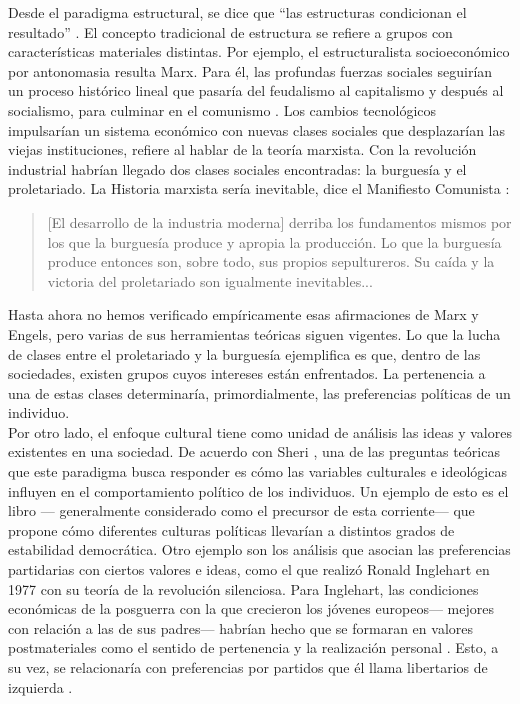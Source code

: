 Desde el paradigma estructural, se dice que ``las estructuras condicionan el resultado'' \parencite{BV08}. El concepto tradicional de estructura se refiere a grupos con características materiales distintas. Por ejemplo, el estructuralista socioeconómico por antonomasia resulta Marx. Para él, las profundas fuerzas sociales seguirían un proceso histórico lineal que pasaría del feudalismo al capitalismo y después al socialismo, para culminar en el comunismo \parencite{BV08}. Los cambios tecnológicos impulsarían un sistema económico con nuevas clases sociales que desplazarían las viejas instituciones, refiere \textcite{Heilbroner92} al hablar de la teoría marxista. Con la revolución industrial habrían llegado dos clases sociales encontradas: la burguesía y el proletariado. La Historia marxista sería inevitable, dice el Manifiesto Comunista \parencite{Heilbroner92}: 
\begin{quote}
[El desarrollo de la industria moderna] derriba los fundamentos mismos por los que la burguesía produce y apropia la producción. Lo que la burguesía produce entonces son, sobre todo, sus propios sepultureros. Su caída y la victoria del proletariado son igualmente inevitables...
\end{quote}

Hasta ahora no hemos verificado empíricamente esas afirmaciones de Marx y Engels, pero varias de sus herramientas teóricas siguen vigentes. Lo que la lucha de clases entre el proletariado y la burguesía ejemplifica es que, dentro de las sociedades, existen grupos cuyos intereses están enfrentados. La pertenencia a una de estas clases determinaría, primordialmente, las preferencias políticas de un individuo.\\

Por otro lado, el enfoque cultural tiene como unidad de análisis las ideas y valores existentes en una sociedad. 
De acuerdo con Sheri \textcite{Berman01}, una de las preguntas teóricas que este paradigma busca responder es cómo las variables culturales e ideológicas influyen en el comportamiento político de los individuos. Un ejemplo de esto es el libro  \parencite{AlmondVerba63}--- generalmente considerado como el precursor de esta corriente--- que propone cómo diferentes culturas políticas llevarían a distintos grados de estabilidad democrática. Otro ejemplo son los análisis que asocian las preferencias partidarias con ciertos valores e ideas, como el que realizó Ronald Inglehart en 1977 con su teoría de la revolución silenciosa. Para Inglehart, las condiciones económicas de la posguerra con la que crecieron los jóvenes europeos--- mejores con relación a las de sus padres--- habrían hecho que se formaran en valores postmateriales como el sentido de pertenencia y la realización personal \parencite{Kesselman79}. Esto, a su vez, se relacionaría con preferencias por partidos que él llama libertarios de izquierda \parencite{Inglehart16}.\\ 

